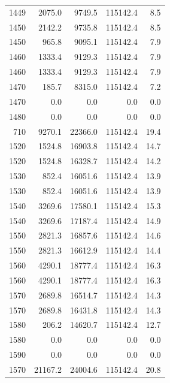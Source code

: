 \begin{longtable}{rrrrr}
    1449 & \num{2075.0} & \num{9749.5} & \num{115142.4} & 8.5 \\
    1450 & \num{2142.2} & \num{9735.8} & \num{115142.4} & 8.5 \\
    1450 & \num{965.8} & \num{9095.1} & \num{115142.4} & 7.9 \\
    1460 & \num{1333.4} & \num{9129.3} & \num{115142.4} & 7.9 \\
    1460 & \num{1333.4} & \num{9129.3} & \num{115142.4} & 7.9 \\
    1470 & \num{185.7} & \num{8315.0} & \num{115142.4} & 7.2 \\
    1470 & \num{0.0} & \num{0.0} & \num{0.0} & 0.0 \\
    1480 & \num{0.0} & \num{0.0} & \num{0.0} & 0.0 \\
    710 & \num{9270.1} & \num{22366.0} & \num{115142.4} & 19.4 \\
    1520 & \num{1524.8} & \num{16903.8} & \num{115142.4} & 14.7 \\
    1520 & \num{1524.8} & \num{16328.7} & \num{115142.4} & 14.2 \\
    1530 & \num{852.4} & \num{16051.6} & \num{115142.4} & 13.9 \\
    1530 & \num{852.4} & \num{16051.6} & \num{115142.4} & 13.9 \\
    1540 & \num{3269.6} & \num{17580.1} & \num{115142.4} & 15.3 \\
    1540 & \num{3269.6} & \num{17187.4} & \num{115142.4} & 14.9 \\
    1550 & \num{2821.3} & \num{16857.6} & \num{115142.4} & 14.6 \\
    1550 & \num{2821.3} & \num{16612.9} & \num{115142.4} & 14.4 \\
    1560 & \num{4290.1} & \num{18777.4} & \num{115142.4} & 16.3 \\
    1560 & \num{4290.1} & \num{18777.4} & \num{115142.4} & 16.3 \\
    1570 & \num{2689.8} & \num{16514.7} & \num{115142.4} & 14.3 \\
    1570 & \num{2689.8} & \num{16431.8} & \num{115142.4} & 14.3 \\
    1580 & \num{206.2} & \num{14620.7} & \num{115142.4} & 12.7 \\
    1580 & \num{0.0} & \num{0.0} & \num{0.0} & 0.0 \\
    1590 & \num{0.0} & \num{0.0} & \num{0.0} & 0.0 \\
    1570 & \num{21167.2} & \num{24004.6} & \num{115142.4} & 20.8 \\

\end{longtable}

